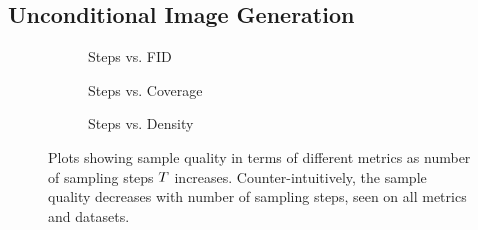 

\subsection{Unconditional Image Generation}
\label{subsec:evaluationUnconditional}

\begin{figure}[ht!]
    \centering
    \begin{subfigure}[b]{0.33\textwidth}
        \centering
        \resizebox{\textwidth}{!}{
            
        }
        \caption{Steps vs. FID}
    \end{subfigure}
    \hfill
    \begin{subfigure}[b]{0.33\textwidth}
        \centering
        \resizebox{\textwidth}{!}{
            
        }
        \caption{Steps vs. Coverage}
    \end{subfigure}
    \hfill
    \begin{subfigure}[b]{0.33\textwidth}
        \centering
        \resizebox{\textwidth}{!}{
            
        }
        \caption{Steps vs. Density}
    \end{subfigure}
    \caption{
        Plots showing sample quality in terms of different metrics as
        number of sampling steps $T$ increases. Counter-intuitively, the
        sample quality decreases with number of sampling steps, seen on
        all metrics and datasets.
    }
    \label{fig:step}
\end{figure}

